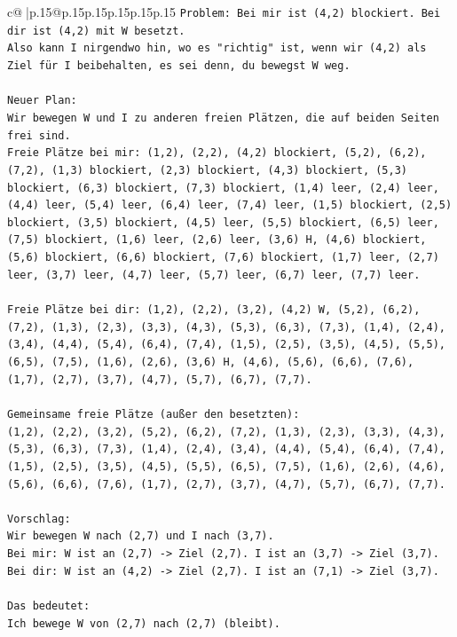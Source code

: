 \documentclass{article}
\begin{document}
{\begin{supertabular}{c@{$\;$}|p{.15\linewidth}@{}p{.15\linewidth}p{.15\linewidth}p{.15\linewidth}p{.15\linewidth}p{.15\linewidth}}
{{{\texttt{Problem: Bei mir ist (4,2) blockiert. Bei dir ist (4,2) mit W besetzt.} \\
\texttt{Also kann I nirgendwo hin, wo es "richtig" ist, wenn wir (4,2) als Ziel für I beibehalten, es sei denn, du bewegst W weg.} \\
\\ 
\texttt{Neuer Plan:} \\
\texttt{Wir bewegen W und I zu anderen freien Plätzen, die auf beiden Seiten frei sind.} \\
\texttt{Freie Plätze bei mir: (1,2), (2,2), (4,2) blockiert, (5,2), (6,2), (7,2), (1,3) blockiert, (2,3) blockiert, (4,3) blockiert, (5,3) blockiert, (6,3) blockiert, (7,3) blockiert, (1,4) leer, (2,4) leer, (4,4) leer, (5,4) leer, (6,4) leer, (7,4) leer, (1,5) blockiert, (2,5) blockiert, (3,5) blockiert, (4,5) leer, (5,5) blockiert, (6,5) leer, (7,5) blockiert, (1,6) leer, (2,6) leer, (3,6) H, (4,6) blockiert, (5,6) blockiert, (6,6) blockiert, (7,6) blockiert, (1,7) leer, (2,7) leer, (3,7) leer, (4,7) leer, (5,7) leer, (6,7) leer, (7,7) leer.} \\
\\ 
\texttt{Freie Plätze bei dir: (1,2), (2,2), (3,2), (4,2) W, (5,2), (6,2), (7,2), (1,3), (2,3), (3,3), (4,3), (5,3), (6,3), (7,3), (1,4), (2,4), (3,4), (4,4), (5,4), (6,4), (7,4), (1,5), (2,5), (3,5), (4,5), (5,5), (6,5), (7,5), (1,6), (2,6), (3,6) H, (4,6), (5,6), (6,6), (7,6), (1,7), (2,7), (3,7), (4,7), (5,7), (6,7), (7,7).} \\
\\ 
\texttt{Gemeinsame freie Plätze (außer den besetzten):} \\
\texttt{(1,2), (2,2), (3,2), (5,2), (6,2), (7,2), (1,3), (2,3), (3,3), (4,3), (5,3), (6,3), (7,3), (1,4), (2,4), (3,4), (4,4), (5,4), (6,4), (7,4), (1,5), (2,5), (3,5), (4,5), (5,5), (6,5), (7,5), (1,6), (2,6), (4,6), (5,6), (6,6), (7,6), (1,7), (2,7), (3,7), (4,7), (5,7), (6,7), (7,7).} \\
\\ 
\texttt{Vorschlag:} \\
\texttt{Wir bewegen W nach (2,7) und I nach (3,7).} \\
\texttt{Bei mir: W ist an (2,7) {-}> Ziel (2,7). I ist an (3,7) {-}> Ziel (3,7).} \\
\texttt{Bei dir: W ist an (4,2) {-}> Ziel (2,7). I ist an (7,1) {-}> Ziel (3,7).} \\
\\ 
\texttt{Das bedeutet:} \\
\texttt{Ich bewege W von (2,7) nach (2,7) (bleibt).} \\
}}}
\end{supertabular}}
\end{document}
